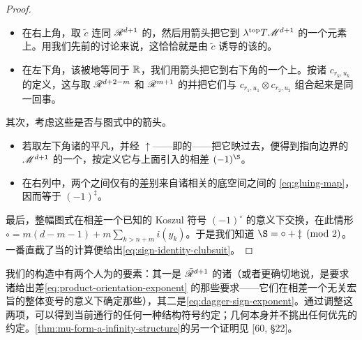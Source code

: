 \begin{proof}
\begin{itemize}
\item 在右上角，取 $\tilde{c}$ 连同 $\mathscr{R}^{d+1}$ 的\trOrientation，然后用\trHorizontal{}箭头把它\trTransfer{}到 $\lambda^{\mathrm{top}}T\mathscr{M}^{d+1}$ 的一个元素上。用我们先前的讨论来说，这恰恰就是由 $\tilde{c}$ 诱导的该\trModuliSpace{}的\trOrientation。
\item 在左下角，该\trVectorSpace{}被\trCanonical{}地等同于 $\mathbb{R}$，我们用\trHorizontal{}箭头把它\trTransfer{}到右下角的一个\trTrivialization{}上。按诸 $c_{r_k,u_k}$ 的定义，这与取 $\mathscr{R}^{d+2-m}$ 和 $\mathscr{R}^{m+1}$ 的\trOrientation{}并把它们与 $c_{r_1,u_1}\otimes c_{r_2,u_2}$ 组合起来是同一回事。
\end{itemize}
其次，考虑这些\trOrientation{}是否与图式中的\trVertical{}箭头\trCompatible。
\begin{itemize}
\item 若取左下角诸\trModuliSpace{}的平凡\trOrientation，并经 $\uparrow$——即\trGluingMap{}的\trLinearization——把它映过去，便得到指向\trGromov{}边界的 $\mathscr{M}^{d+1}$ 的一个\trOrientation，按定义它与上面引入的\trOrientation{}相差 $(-1)^{\text{\S}}$。
\item 在右列中，两个\trOrientation{}之间仅有的差别来自诸相关\trFamily{}的底空间之间的\trGluingMap{} \eqref{eq:gluing-map}，因而等于 $(-1)^{\ddagger}$。
\end{itemize}
最后，整幅图式在相差一个已知的 Koszul 符号 $(-1)^{\circ}$ 的意义下交换，在此情形 $\circ=m(d-m-1)+m\sum_{k>n+m}i(y_k)$。于是我们知道 $\text{\S}=\circ+\ddagger\pmod{2}$。一番直截了当的计算便给出\eqref{eq:sign-identity-clubsuit}。
\end{proof}
\begin{remark}\label{thm:sign-convention-remark}
我们的构造中有两个人为的要素：其一是 $\bar{\mathscr{R}}^{d+1}$ 的诸\trOrientation（或者更确切地说，是要求诸\trBoundaryStratum{}给出\trOrientation{}差\eqref{eq:product-orientation-exponent} 的那些要求——它们在相差一个无关宏旨的整体变号的意义下确定那些\trOrientation），其二是\eqref{eq:dagger-sign-exponent}。通过调整这两项，可以得到当前通行的任何一种\trAinfty{}结构符号约定；几何本身并不挑出任何优先的约定。\cref{thm:mu-form-a-infinity-structure}的另一个证明见 [60, \S22]。
\end{remark}
